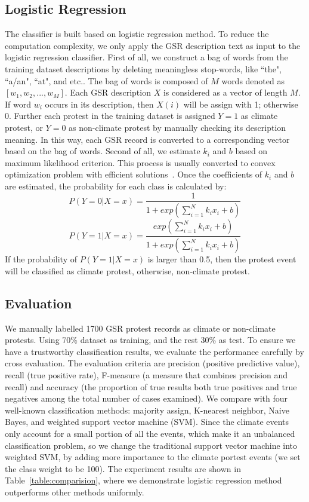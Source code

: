 \subsection{Logistic Regression}
The classifier is built based on logistic regression method.
To reduce the computation complexity, we only apply the GSR description text as input to the logistic regression classifier. First of all, we construct a bag of words from the training dataset descriptions by deleting meaningless stop-words, like ``the", ``a/an", ``at", and etc.. The bag of words is composed of $M$ words denoted as $[w_1, w_2, ..., w_M]$.
Each GSR description $X$ is considered as a vector of length $M$. If word $w_i$ occurs in its description, then $X(i)$ will be assign with 1; otherwise 0. Further each protest in the training dataset is assigned $Y=1$ as climate protest, or $Y=0$ as non-climate protest by manually checking its description meaning. In this way, each GSR record is converted to a corresponding vector based on the bag of words. Second of all, we estimate $k_i$ and $b$ based on maximum likelihood criterion. This process is usually converted to convex optimization problem with efficient solutions~\cite{james2013introduction}. Once the coefficients of $k_i$ and $b$ are estimated, the probability for each class is calculated by:
$$P(Y = 0| X=x)= \frac{1}{1+exp( {\sum_{i=1}^{N} k_ix_i}+b)}$$
$$P(Y = 1| X=x)= \frac{exp( {\sum_{i=1}^{N} k_ix_i}+b)}{1+exp( {\sum_{i=1}^{N} k_ix_i}+b)}$$
If the probability of $P(Y = 1| X=x)$ is larger than 0.5, then the protest event will be classified as climate protest, otherwise, non-climate protest.


\subsection{Evaluation}
We manually labelled 1700 GSR protest records as climate or non-climate protests. Using 70\% dataset as training, and the rest 30\% as test. To ensure we have a trustworthy classification results, we evaluate the performance carefully by cross evaluation. The evaluation criteria are precision (positive predictive value), recall (true positive rate), F-measure (a measure that combines precision and recall) and accuracy (the proportion of true results both true positives and true negatives among the total number of cases examined). We compare with four well-known classification methods: majority assign, K-nearest neighbor, Naive Bayes, and weighted support vector machine (SVM). Since the climate events only account for a small portion of all the events, which make it an unbalanced classification problem, so we change the traditional support vector machine into weighted SVM, by adding more importance to the climate portest events (we set the class weight to be 100). The experiment results are shown in Table~\ref{table:comparision}, where we demonstrate logistic regression method outperforms other methods uniformly.

